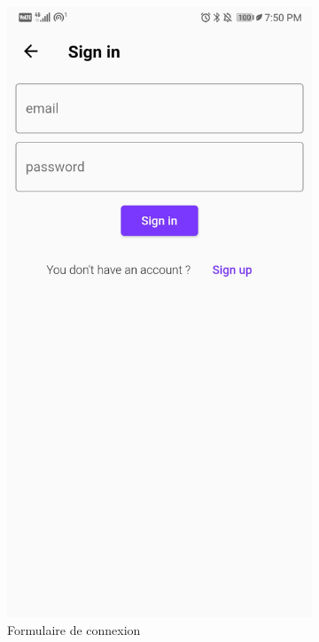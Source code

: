 \begin{appendices}
\begin{landscape}
\begin{figure}[h]
\begin{subfigure}{.25\textwidth}
    \includegraphics[width=.75\linewidth]{content/imgs/screen11.jpg}
    \caption{Formulaire de connexion}
    \label{appendix:screen_log}
  \end{subfigure}%
  \begin{subfigure}{.25\textwidth}
    \centering

\end{subfigure}
\end{figure}
\end{landscape}
\end{appendices}
